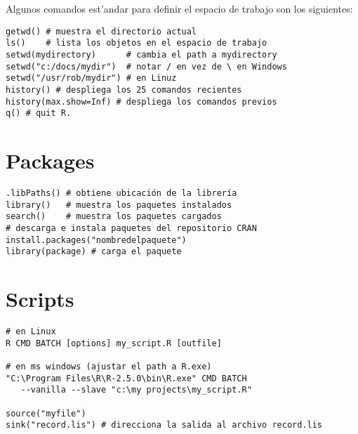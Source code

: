 Algunos comandos est'andar para definir el espacio de trabajo son los siguientes:

\begin{verbatim}
getwd() # muestra el directorio actual
ls()    # lista los objetos en el espacio de trabajo
setwd(mydirectory)      # cambia el path a mydirectory
setwd("c:/docs/mydir")  # notar / en vez de \ en Windows
setwd("/usr/rob/mydir") # en Linuz
history() # despliega los 25 comandos recientes
history(max.show=Inf) # despliega los comandos previos
q() # quit R. 
\end{verbatim}

\section{Packages}
\begin{verbatim}
.libPaths() # obtiene ubicación de la librería
library()   # muestra los paquetes instalados
search()    # muestra los paquetes cargados
# descarga e instala paquetes del repositorio CRAN
install.packages("nombredelpaquete")  
library(package) # carga el paquete
\end{verbatim}

\section{Scripts}
\begin{verbatim}
# en Linux
R CMD BATCH [options] my_script.R [outfile] 

# en ms windows (ajustar el path a R.exe)
"C:\Program Files\R\R-2.5.0\bin\R.exe" CMD BATCH
   --vanilla --slave "c:\my projects\my_script.R" 

source("myfile")
sink("record.lis") # direcciona la salida al archivo record.lis
\end{verbatim}



